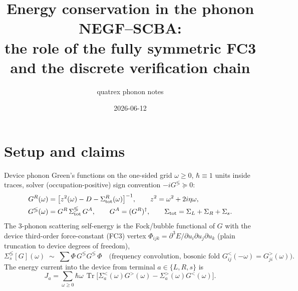 \documentclass[11pt]{article}
\title{Energy conservation in the phonon NEGF--SCBA:\\
the role of the fully symmetric FC3 and the discrete verification chain}
\author{quatrex phonon notes}
\date{2026-06-12}
\newcommand{\Tr}{\operatorname{Tr}}
\begin{document}
\maketitle

\section{Setup and claims}
Device phonon Green's functions on the one-sided grid $\omega\ge 0$,
$\hbar\equiv 1$ units inside traces, solver (occupation-positive) sign
convention $-i G^{\lessgtr}\succeq 0$:
\begin{align}
  G^R(\omega) &= \bigl[z^2(\omega) - D - \Sigma^R_{\rm tot}(\omega)\bigr]^{-1},
  \qquad z^2 = \omega^2 + 2i\eta\omega, \\
  G^{\lessgtr}(\omega) &= G^R\,\Sigma^{\lessgtr}_{\rm tot}\,G^A,
  \qquad G^A=(G^R)^\dagger,\qquad
  \Sigma_{\rm tot} = \Sigma_L + \Sigma_R + \Sigma_s .
\end{align}
The 3-phonon scattering self-energy is the Fock/bubble functional of $G$
with the device third-order force-constant (FC3) vertex
$\Phi_{ijk}=\partial^3 E/\partial u_i\partial u_j\partial u_k$
(plain truncation to device degrees of freedom),
\begin{equation}
  \Sigma_s^{\lessgtr}[G](\omega)\;\sim\;\sum \Phi\, G^{\lessgtr}G^{\lessgtr}\,\Phi
  \quad\text{(frequency convolution, bosonic fold } G^<_{ij}(-\omega)=G^>_{ji}(\omega)).
\end{equation}
The energy current into the device from terminal $a\in\{L,R,s\}$ is
\begin{equation}
  J_a=\sum_{\omega\ge 0}\hbar\omega\,
  \Tr\!\bigl[\Sigma_a^<(\omega)G^>(\omega)-\Sigma_a^>(\omega)G^<(\omega)\bigr].
  \label{eq:mw}
\end{equation}
\end{document}
